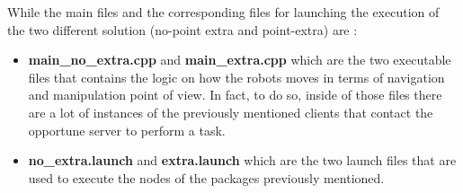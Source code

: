 While the main files and the corresponding files for launching the execution of the two different solution (no-point extra and point-extra) are :
\begin{itemize}
    \item \textbf{main\_no\_extra.cpp} and \textbf{main\_extra.cpp} which are the two executable files that contains the logic on how the robots moves in terms of navigation and manipulation point of view. In fact, to do so, inside of those files there are a lot of instances of the previously mentioned clients that contact the opportune server to perform a task.
    \item \textbf{no\_extra.launch} and \textbf{extra.launch} which are the two launch files that are used to execute the nodes of the packages previously mentioned.
\end{itemize}